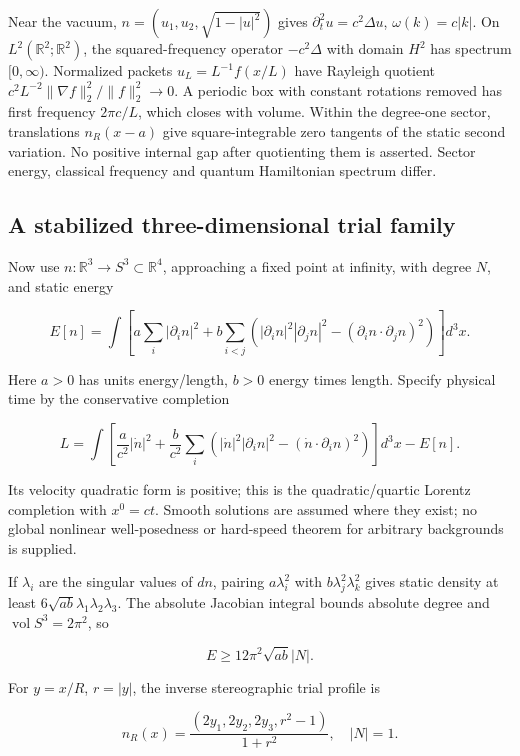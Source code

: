 \documentclass[11pt,a4paper]{article}
\begin{document}
Near the vacuum, \(n=(u_1,u_2,\sqrt{1-|u|^2})\) gives
\(\partial_t^2u=c^2\Delta u\), \(\omega(k)=c|k|\). On
\(L^2(\mathbb R^2;\mathbb R^2)\), the squared-frequency operator
\(-c^2\Delta\) with domain \(H^2\) has spectrum \([0,\infty)\).
Normalized packets \(u_L=L^{-1}f(x/L)\) have Rayleigh quotient
\(c^2L^{-2}\|\nabla f\|_2^2/\|f\|_2^2\to0\). A periodic box with
constant rotations removed has first frequency \(2\pi c/L\), which
closes with volume. Within the degree-one sector, translations
\(n_R(x-a)\) give square-integrable zero tangents of the static second
variation. No positive internal gap after quotienting them is asserted.
Sector energy, classical frequency and quantum Hamiltonian spectrum
differ.

\hypertarget{a-stabilized-three-dimensional-trial-family}{%
\subsection{A stabilized three-dimensional trial
family}\label{a-stabilized-three-dimensional-trial-family}}

Now use \(n:\mathbb R^3\to S^3\subset\mathbb R^4\), approaching a fixed
point at infinity, with degree \(N\), and static energy

\[E[n]=\int\left[a\sum_i|\partial_in|^2+
 b\sum_{i<j}(|\partial_in|^2|\partial_jn|^2
 -(\partial_in\cdot\partial_jn)^2)\right]d^3x.\]

Here \(a>0\) has units energy/length, \(b>0\) energy times length.
Specify physical time by the conservative completion

\[L=\int\left[\frac a{c^2}|\dot n|^2+
 \frac b{c^2}\sum_i(|\dot n|^2|\partial_in|^2
 -(\dot n\cdot\partial_in)^2)\right]d^3x-E[n].\]

Its velocity quadratic form is positive; this is the quadratic/quartic
Lorentz completion with \(x^0=ct\). Smooth solutions are assumed where
they exist; no global nonlinear well-posedness or hard-speed theorem for
arbitrary backgrounds is supplied.

If \(\lambda_i\) are the singular values of \(dn\), pairing
\(a\lambda_i^2\) with \(b\lambda_j^2\lambda_k^2\) gives static density
at least \(6\sqrt{ab}\lambda_1\lambda_2\lambda_3\). The absolute
Jacobian integral bounds absolute degree and
\(\operatorname{vol}S^3=2\pi^2\), so

\[E\ge12\pi^2\sqrt{ab}|N|.\]

For \(y=x/R\), \(r=|y|\), the inverse stereographic trial profile is

\[n_R(x)=\frac{(2y_1,2y_2,2y_3,r^2-1)}{1+r^2},\quad |N|=1.\]
\end{document}
